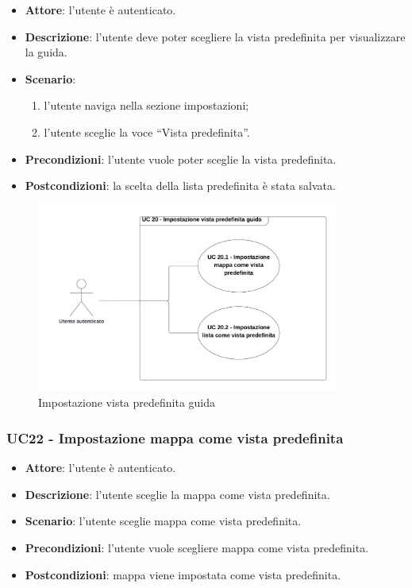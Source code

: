 \begin{itemize}
    \item \textbf{Attore}: l'utente è autenticato.
    \item \textbf{Descrizione}: l'utente deve poter scegliere la vista predefinita per visualizzare la guida.
    \item \textbf{Scenario}:
    \begin{enumerate}
        \item l'utente naviga nella sezione impostazioni;
        \item l'utente sceglie la voce “Vista predefinita”.
    \end{enumerate}

    \item \textbf{Precondizioni}: l'utente vuole poter sceglie la vista predefinita.
    \item \textbf{Postcondizioni}: la scelta della lista predefinita è stata salvata.
\end{itemize}

\begin{figure}[!h]
    \includegraphics[width=10cm]{sezioni/Images/UC20_s.png}
    \centering
    \caption{Impostazione vista predefinita guida}
\end{figure}

\subsubsection{UC22 - Impostazione mappa come vista predefinita}
\begin{itemize}
    \item \textbf{Attore}: l'utente è autenticato.
    \item \textbf{Descrizione}: l'utente sceglie la mappa come vista predefinita.
    \item \textbf{Scenario}: l'utente sceglie mappa come vista predefinita.
    \item \textbf{Precondizioni}: l'utente vuole scegliere mappa come vista predefinita.
    \item \textbf{Postcondizioni}: mappa viene impostata come vista predefinita.

\end{itemize}

